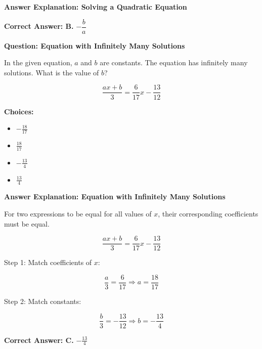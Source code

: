 \documentclass{beamer}
\begin{document}
\begin{frame}{\textbf{Answer Explanation: Solving a Quadratic Equation}}



\textbf{Correct Answer: B.} \( \boxed{-\dfrac{b}{a}} \)

\end{frame}


\begin{frame}{\textbf{Question: Equation with Infinitely Many Solutions}}

In the given equation, \( a \) and \( b \) are constants. The equation has infinitely many solutions. What is the value of \( b \)?

\[
\frac{ax + b}{3} = \frac{6}{17}x - \frac{13}{12}
\]

\textbf{Choices:}
\begin{itemize}
    \item[A.] \( -\frac{18}{17} \)
    \item[B.] \( \frac{18}{17} \)
    \item[C.] \( -\frac{13}{4} \)
    \item[D.] \( \frac{13}{4} \)
\end{itemize}

\end{frame}



\begin{frame}{\textbf{Answer Explanation: Equation with Infinitely Many Solutions}}

For two expressions to be equal for all values of \( x \), their corresponding coefficients must be equal.

\[
\frac{ax + b}{3} = \frac{6}{17}x - \frac{13}{12}
\]

Step 1: Match coefficients of \( x \):

\[
\frac{a}{3} = \frac{6}{17} \Rightarrow a = \frac{18}{17}
\]

Step 2: Match constants:

\[
\frac{b}{3} = -\frac{13}{12} \Rightarrow b = -\frac{13}{4}
\]

\textbf{Correct Answer: C.} \( \boxed{-\frac{13}{4}} \)

\end{frame}
\end{document}
